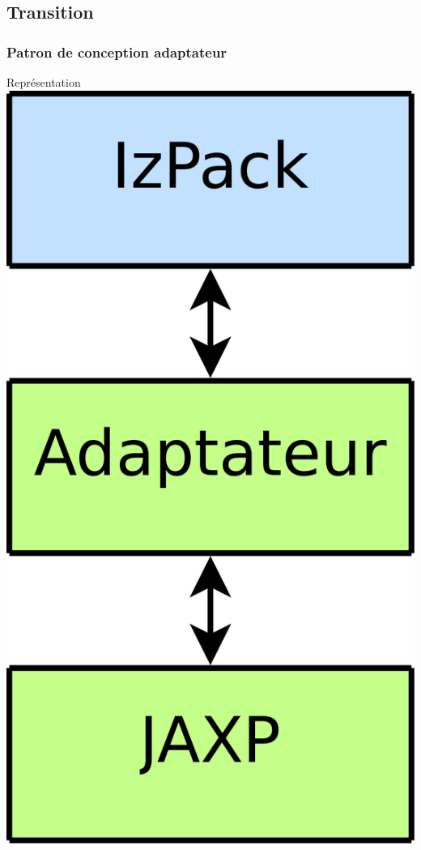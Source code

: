 \subsection{Transition}
\begin{frame}
\frametitle{Patron de conception adaptateur}

\begin{minipage}[c]{.3\linewidth}
\begin{beamerboxesrounded}[shadow=true]{Représentation}
	\centering
	\includegraphics[width=.8\linewidth]{../image/avecAdaptateur.png}

\end{beamerboxesrounded}
\end{minipage}
\end{frame}
